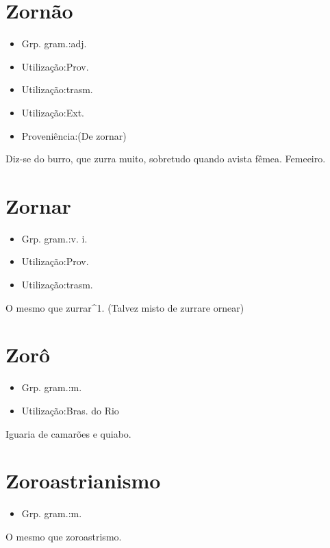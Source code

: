 \section{Zornão}
\begin{itemize}
\item {Grp. gram.:adj.}
\end{itemize}
\begin{itemize}
\item {Utilização:Prov.}
\end{itemize}
\begin{itemize}
\item {Utilização:trasm.}
\end{itemize}
\begin{itemize}
\item {Utilização:Ext.}
\end{itemize}
\begin{itemize}
\item {Proveniência:(De \textunderscore zornar\textunderscore )}
\end{itemize}
Diz-se do burro, que zurra muito, sobretudo quando avista fêmea.
Femeeiro.
\section{Zornar}
\begin{itemize}
\item {Grp. gram.:v. i.}
\end{itemize}
\begin{itemize}
\item {Utilização:Prov.}
\end{itemize}
\begin{itemize}
\item {Utilização:trasm.}
\end{itemize}
O mesmo que \textunderscore zurrar\textunderscore ^1.
(Talvez misto de \textunderscore zurrar\textunderscore  e \textunderscore ornear\textunderscore )
\section{Zorô}
\begin{itemize}
\item {Grp. gram.:m.}
\end{itemize}
\begin{itemize}
\item {Utilização:Bras. do Rio}
\end{itemize}
Iguaria de camarões e quiabo.
\section{Zoroastrianismo}
\begin{itemize}
\item {Grp. gram.:m.}
\end{itemize}
O mesmo que \textunderscore zoroastrismo\textunderscore .
